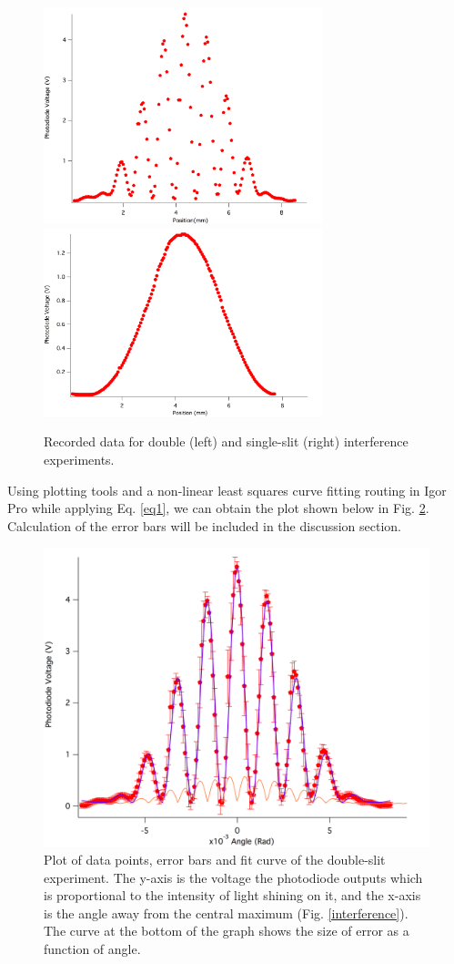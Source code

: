 \documentclass[prb,preprint]{revtex4-1}
\begin{document}
\begin{figure}[h]
\centering
\includegraphics[width=3.2in]{doubleres.png}
\includegraphics[width=3.2in]{singleres.png}
\caption{Recorded data for double (left) and single-slit (right) interference experiments.}
\label{ds}
\end{figure}

Using plotting tools and a non-linear least squares curve fitting routing in Igor Pro while applying Eq. \ref{eq1}, we can obtain the plot shown below in Fig. \ref{double}. Calculation of the error bars will be included in the discussion section.\\

\begin{figure}[h]
\centering
\includegraphics[width=7in]{double.png}
\caption{Plot of data points, error bars and fit curve of the double-slit experiment. The y-axis is the voltage the photodiode outputs which is proportional to the intensity of light shining on it, and the x-axis is the angle away from the central maximum (Fig. \ref{interference}). The curve at the bottom of the graph shows the size of error as a function of angle.}
\label{double}
\end{figure}
\end{document}
